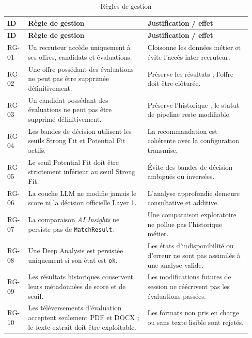 \small
\begin{longtable}{|p{1.7cm}|p{7.2cm}|p{5.8cm}|}
\caption{Règles de gestion}\label{tab:regles-gestion}\\
\hline
\textbf{ID} & \textbf{Règle de gestion} & \textbf{Justification / effet}\\
\hline
\endfirsthead
\hline \textbf{ID} & \textbf{Règle de gestion} & \textbf{Justification / effet}\\ \hline
\endhead
RG-01 & Un recruteur accède uniquement à ses offres, candidats et évaluations. & Cloisonne les données métier et évite l'accès inter-recruteur.\\
\hline
RG-02 & Une offre possédant des évaluations ne peut pas être supprimée définitivement. & Préserve les résultats ; l'offre doit être clôturée.\\
\hline
RG-03 & Un candidat possédant des évaluations ne peut pas être supprimé définitivement. & Préserve l'historique ; le statut de pipeline reste modifiable.\\
\hline
RG-04 & Les bandes de décision utilisent les seuils Strong Fit et Potential Fit actifs. & La recommandation est cohérente avec la configuration transmise.\\
\hline
RG-05 & Le seuil Potential Fit doit être strictement inférieur au seuil Strong Fit. & Évite des bandes de décision ambiguës ou inversées.\\
\hline
RG-06 & La couche LLM ne modifie jamais le score ni la décision officielle Layer 1. & L'analyse approfondie demeure consultative et additive.\\
\hline
RG-07 & La comparaison \textit{AI Insights} ne persiste pas de \texttt{MatchResult}. & Une comparaison exploratoire ne pollue pas l'historique métier.\\
\hline
RG-08 & Une Deep Analysis est persistée uniquement si son état est \texttt{ok}. & Les états d'indisponibilité ou d'erreur ne sont pas assimilés à une analyse valide.\\
\hline
RG-09 & Les résultats historiques conservent leurs métadonnées de score et de seuil. & Les modifications futures de session ne réécrivent pas les évaluations passées.\\
\hline
RG-10 & Les téléversements d'évaluation acceptent seulement PDF et DOCX ; le texte extrait doit être exploitable. & Les formats non pris en charge ou sans texte lisible sont rejetés.\\
\hline
\end{longtable}
\normalsize

